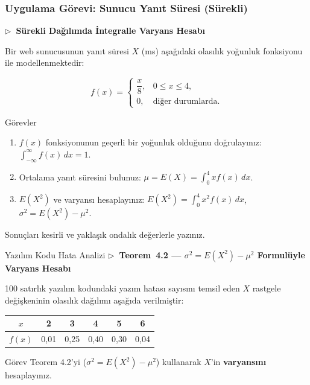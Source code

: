 ﻿\documentclass[light]{lutbeamer}
\begin{document}
\begin{frame}[fragile]
  \frametitle{Uygulama Görevi: Sunucu Yanıt Süresi (Sürekli)}
  \textbf{\small $\triangleright$~Sürekli Dağılımda İntegralle Varyans Hesabı}

  \smallskip
  \small
  Bir web sunucusunun yanıt süresi $X$ (ms) aşağıdaki olasılık yoğunluk fonksiyonu ile modellenmektedir:

  \[
    f(x) =
    \begin{cases}
      \dfrac{x}{8}, & 0 \le x \le 4, \\
      0,            & \text{diğer durumlarda.}
    \end{cases}
  \]

  \begin{block}{Görevler}
    \footnotesize
    \begin{enumerate}
      \item $f(x)$ fonksiyonunun geçerli bir yoğunluk olduğunu doğrulayınız: $\int_{-\infty}^{\infty} f(x)\,dx = 1$.
      \item Ortalama yanıt süresini bulunuz: $\mu = E(X) = \int_{0}^{4} x f(x)\,dx$.
      \item $E(X^2)$ ve varyansı hesaplayınız: $E(X^2) = \int_{0}^{4} x^2 f(x)\,dx$, $\sigma^2 = E(X^2) - \mu^2$.
    \end{enumerate}
  \end{block}

  \footnotesize
  Sonuçları kesirli ve yaklaşık ondalık değerlerle yazınız.
\end{frame}

\begin{frame}{Yazılım Kodu Hata Analizi}
  \textbf{\small $\triangleright$~Teorem~4.2 --- $\sigma^2 = E(X^2) - \mu^2$ Formulüyle Varyans Hesabı}

  \smallskip
  \small
  100 satırlık yazılım kodundaki yazım hatası sayısını temsil eden $X$ rastgele değişkeninin olasılık dağılımı aşağıda verilmiştir:

  \medskip
  \begin{center}
    \renewcommand{\arraystretch}{1.2}
    \begin{tabular}{cccccc}
      \toprule
      $x$ & 2 & 3 & 4 & 5 & 6 \\
      \midrule
      $f(x)$ & 0{,}01 & 0{,}25 & 0{,}40 & 0{,}30 & 0{,}04 \\
      \bottomrule
    \end{tabular}
  \end{center}

  \medskip
  \begin{block}{Görev}
    Teorem 4.2'yi ($\sigma^2 = E(X^2) - \mu^2$) kullanarak $X$'in \textbf{varyansını} hesaplayınız.
  \end{block}
\end{frame}
\end{document}
